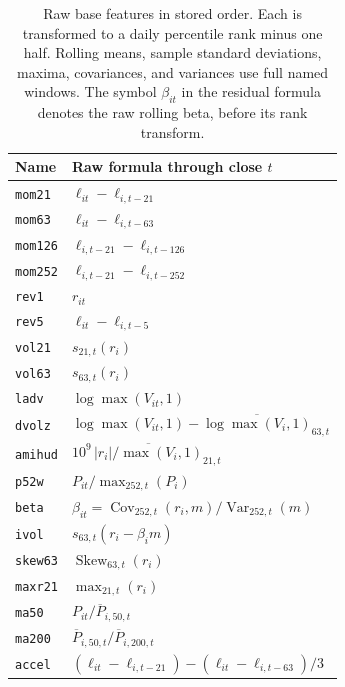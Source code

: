\begin{table}[t]
\centering
\caption{Raw base features in stored order. Each is transformed to a daily percentile rank minus one half. Rolling means, sample standard deviations, maxima, covariances, and variances use full named windows. The symbol $\beta_{it}$ in the residual formula denotes the raw rolling beta, before its rank transform.}
\label{tab:features}
\small
\begin{tabular}{@{}ll@{}}
\toprule
Name & Raw formula through close $t$\\
\midrule
\texttt{mom21} & $\ell_{it}-\ell_{i,t-21}$\\
\texttt{mom63} & $\ell_{it}-\ell_{i,t-63}$\\
\texttt{mom126} & $\ell_{i,t-21}-\ell_{i,t-126}$\\
\texttt{mom252} & $\ell_{i,t-21}-\ell_{i,t-252}$\\
\texttt{rev1} & $r_{it}$\\
\texttt{rev5} & $\ell_{it}-\ell_{i,t-5}$\\
\texttt{vol21} & $s_{21,t}(r_i)$\\
\texttt{vol63} & $s_{63,t}(r_i)$\\
\texttt{ladv} & $\log\max(V_{it},1)$\\
\texttt{dvolz} & $\log\max(V_{it},1)-\overline{\log\max(V_i,1)}_{63,t}$\\
\texttt{amihud} & $10^9\,\overline{|r_i|/\max(V_i,1)}_{21,t}$\\
\texttt{p52w} & $P_{it}/\max_{252,t}(P_i)$\\
\texttt{beta} & $\beta_{it}=\operatorname{Cov}_{252,t}(r_i,m)/\operatorname{Var}_{252,t}(m)$\\
\texttt{ivol} & $s_{63,t}(r_i-\beta_i m)$\\
\texttt{skew63} & $\operatorname{Skew}_{63,t}(r_i)$\\
\texttt{maxr21} & $\max_{21,t}(r_i)$\\
\texttt{ma50} & $P_{it}/\overline P_{i,50,t}$\\
\texttt{ma200} & $\overline P_{i,50,t}/\overline P_{i,200,t}$\\
\texttt{accel} & $(\ell_{it}-\ell_{i,t-21})-(\ell_{it}-\ell_{i,t-63})/3$\\
\bottomrule
\end{tabular}
\end{table}
